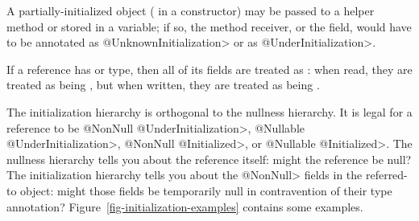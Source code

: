   A partially-initialized object ( in a constructor) may be
  passed to a helper method or stored in a variable; if so, the method
  receiver, or the field, would have to be annotated as
  \<@UnknownInitialization> or as \<@UnderInitialization>.


If a reference has
 or  type, then all of its  fields are treated as
:  when read, they are
treated as being , but when
written, they are treated as being
.

\begin{sloppypar}
The initialization hierarchy is orthogonal to the nullness hierarchy.  It
is legal for a reference to be \<@NonNull @UnderInitialization>, \<@Nullable @UnderInitialization>,
\<@NonNull @Initialized>, or \<@Nullable @Initialized>.  The nullness hierarchy tells
you about the reference itself:  might the reference be null?  The initialization
hierarchy tells you about the \<@NonNull> fields in the referred-to object:
might those fields be temporarily null in contravention of their
type annotation?
Figure~\ref{fig-initialization-examples} contains some examples.
\end{sloppypar}

